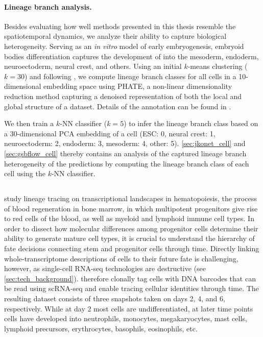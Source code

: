 \paragraph{Lineage branch analysis.}
Besides evaluating how well methods presented in this thesis resemble the spatiotemporal dynamics, we analyze their ability to capture biological heterogeneity.
Serving as an \emph{in vitro} model of early embryogenesis, embryoid bodies differentiation captures the development of  into the mesoderm, endoderm, neuroectoderm, neural crest, and others.
Using an initial $k$-means clustering ($k=30$) and following \citet[Fig. 6, Suppl. Note 4]{moon2019visualizing}, we compute lineage branch classes for all cells in a 10-dimensional embedding space using PHATE, a non-linear dimensionality reduction method capturing a denoised representation of both the local and global structure of a dataset.
Details of the annotation can be found in \citet{bunne2022proximal, bunne2022recovering}.

We then train a $k$-NN classifier ($k=5$) to infer the lineage branch class based on a 30-dimensional PCA embedding of a cell (ESC: 0, neural crest: 1, neuroectoderm: 2, endoderm: 3, mesoderm: 4, other: 5).
\cref{sec:jkonet_cell} and \ref{sec:gsbflow_cell} thereby contains an analysis of the captured lineage branch heterogeneity of the predictions by computing the lineage branch class of each cell using the $k$-NN classifier.

\subsection{\citet{weinreb2020lineage}}
\label{app:dataset_weinreb}

\citet{weinreb2020lineage} study lineage tracing on transcriptional landscapes in hematopoiesis, the process of blood regeneration in bone marrow, in which multipotent progenitors give rise to red cells of the blood, as well as myeloid and lymphoid immune cell types.
In order to dissect how molecular differences among progenitor cells determine their ability to generate mature cell types, it is crucial to understand the hierarchy of fate decisions connecting stem and progenitor cells through time.
Directly linking whole-transcriptome descriptions of cells to their future fate is challenging, however, as single-cell \acrshort{RNA-seq} technologies are destructive (see \cref{sec:tech_background}). 
\citet{weinreb2020lineage} therefore clonally tag cells with DNA barcodes that can be read using sc\acrshort{RNA-seq} and enable tracing cellular identities through time.
The resulting dataset consists of three snapshots taken on days 2, 4, and 6, respectively. While at day 2 most cells are undifferentiated, at later time points cells have developed into neutrophils, monocytes, megakaryocytes, mast cells, lymphoid precursors, erythrocytes, basophils, eosinophils, etc.

